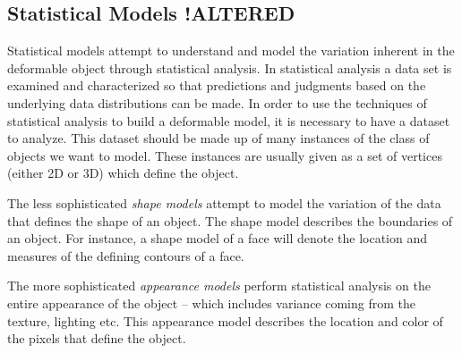 \documentclass[11pt,a4paper]{report}
\begin{document}
\subsection{Statistical Models !ALTERED}
Statistical models attempt to understand and model the variation inherent in the
deformable object through statistical analysis. In statistical analysis a data set
is examined and characterized so that predictions and judgments based on the
underlying data distributions can be made. In order to use the techniques of statistical
analysis to build a deformable model, it is necessary to have a dataset to analyze. This
dataset should be made up of many instances of the class of objects we want to
model. These instances are usually given as a set of vertices (either 2D or 3D)
which define the object. 

The less sophisticated \textit{shape models} attempt to model the variation of the data that defines the shape of an
object. The shape model describes the boundaries of an object. For instance, a
shape model of a face will denote the location and measures of the defining
contours of a face.

The more sophisticated \textit{appearance models} perform statistical analysis on the entire
appearance of the object -- which includes variance coming from the texture, lighting etc. 
This appearance model describes the location and color of the pixels
that define the object.
\end{document}
